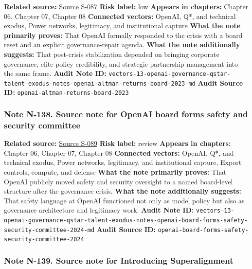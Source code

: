\documentclass[
  american,
  11pt,
  letterpaper,
]{article}
\begin{document}
\textbf{Related source:}
\hyperref[source-s-087-sam-altman-returns-as-ceo-openai-has-a-new-initial-board]{Source
S-087} \textbf{Risk label:} low \textbf{Appears in chapters:} Chapter
06, Chapter 07, Chapter 08 \textbf{Connected vectors:} OpenAI, Q*, and
technical exodus, Power networks, legitimacy, and institutional capture
\textbf{What the note primarily proves:} That OpenAI formally responded
to the crisis with a board reset and an explicit governance-repair
agenda. \textbf{What the note additionally suggests:} That post-crisis
stabilization depended on bringing corporate governance, elite policy
credibility, and strategic partnership management into the same frame.
\textbf{Audit Note ID:}
\texttt{vectors-13-openai-governance-qstar-talent-exodus-notes-openai-altman-returns-board-2023-md}
\textbf{Audit Source ID:} \texttt{openai-altman-returns-board-2023}

\subsubsection{Note N-138. Source note for OpenAI board forms safety and
security
committee}\label{note-n-138-vectors-13-openai-governance-qstar-talent-exodus-notes-openai-board-forms-safety-security-committee-2024-md}

\textbf{Related source:}
\hyperref[source-s-089-openai-board-forms-safety-and-security-committee]{Source
S-089} \textbf{Risk label:} review \textbf{Appears in chapters:} Chapter
06, Chapter 07, Chapter 08 \textbf{Connected vectors:} OpenAI, Q*, and
technical exodus, Power networks, legitimacy, and institutional capture,
Export controls, compute, and defense \textbf{What the note primarily
proves:} That OpenAI publicly moved safety and security oversight to a
named board-level structure after the governance crisis. \textbf{What
the note additionally suggests:} That safety language at OpenAI
functioned not only as model policy but also as governance architecture
and legitimacy work. \textbf{Audit Note ID:}
\texttt{vectors-13-openai-governance-qstar-talent-exodus-notes-openai-board-forms-safety-security-committee-2024-md}
\textbf{Audit Source ID:}
\texttt{openai-board-forms-safety-security-committee-2024}

\subsubsection{Note N-139. Source note for Introducing
Superalignment}\label{note-n-139-vectors-13-openai-governance-qstar-talent-exodus-notes-openai-introducing-superalignment-2023-md}
\end{document}
